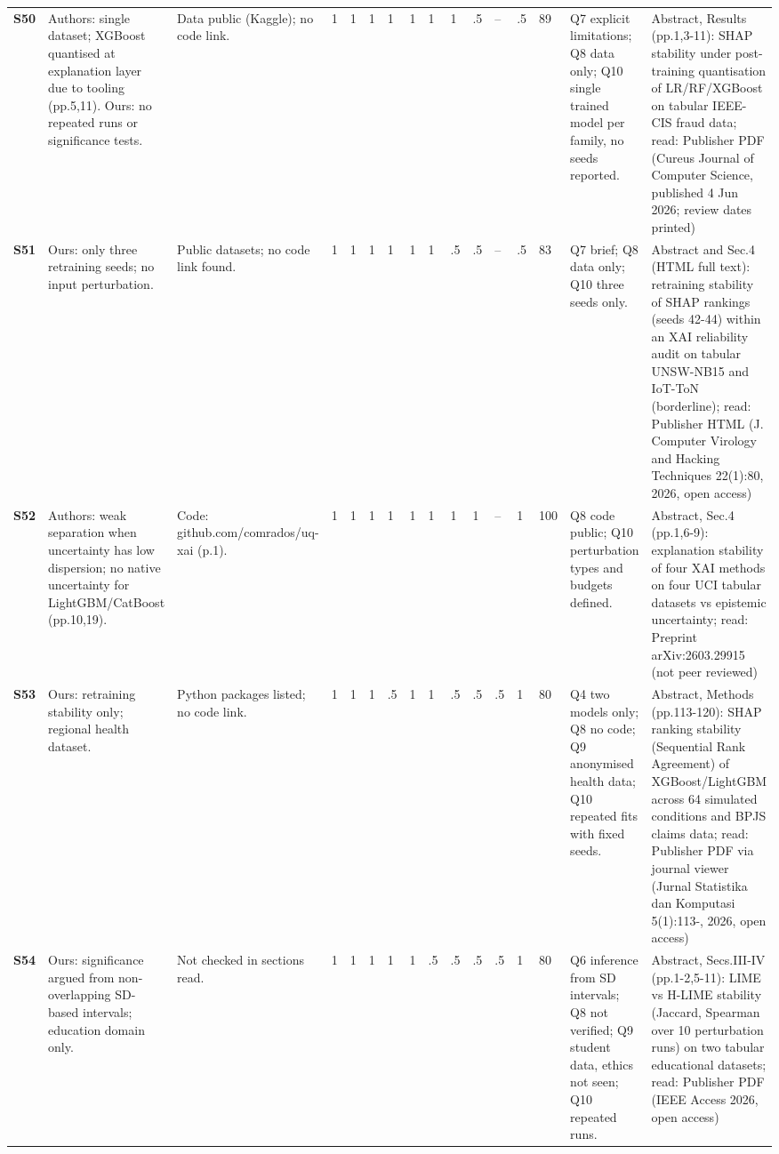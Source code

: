 \begin{longtable}{@{}P{1.0cm}P{4.6cm}P{3.6cm}P{0.3cm}P{0.3cm}P{0.3cm}P{0.3cm}P{0.3cm}P{0.3cm}P{0.3cm}P{0.3cm}P{0.3cm}P{0.36cm}P{0.75cm}P{3.0cm}P{3.9cm}@{}}
\textbf{S50} & Authors: single dataset; XGBoost quantised at explanation layer due to tooling (pp.5,11). Ours: no repeated runs or significance tests. & Data public (Kaggle); no code link. & 1 & 1 & 1 & 1 & 1 & 1 & 1 & .5 & -- & .5 & 89 & Q7 explicit limitations; Q8 data only; Q10 single trained model per family, no seeds reported. & Abstract, Results (pp.1,3-11): SHAP stability under post-training quantisation of LR/\allowbreak{}RF/\allowbreak{}XGBoost on tabular IEEE-CIS fraud data; read: Publisher PDF (Cureus Journal of Computer Science, published 4 Jun 2026; review dates printed) \\
\textbf{S51} & Ours: only three retraining seeds; no input perturbation. & Public datasets; no code link found. & 1 & 1 & 1 & 1 & 1 & 1 & .5 & .5 & -- & .5 & 83 & Q7 brief; Q8 data only; Q10 three seeds only. & Abstract and Sec.4 (HTML full text): retraining stability of SHAP rankings (seeds 42-44) within an XAI reliability audit on tabular UNSW-NB15 and IoT-ToN (borderline); read: Publisher HTML (J. Computer Virology and Hacking Techniques 22(1):80, 2026, open access) \\
\textbf{S52} & Authors: weak separation when uncertainty has low dispersion; no native uncertainty for LightGBM/\allowbreak{}CatBoost (pp.10,19). & Code: github.com/\allowbreak{}comrados/\allowbreak{}uq-xai (p.1). & 1 & 1 & 1 & 1 & 1 & 1 & 1 & 1 & -- & 1 & 100 & Q8 code public; Q10 perturbation types and budgets defined. & Abstract, Sec.4 (pp.1,6-9): explanation stability of four XAI methods on four UCI tabular datasets vs epistemic uncertainty; read: Preprint arXiv:2603.29915 (not peer reviewed) \\
\textbf{S53} & Ours: retraining stability only; regional health dataset. & Python packages listed; no code link. & 1 & 1 & 1 & .5 & 1 & 1 & .5 & .5 & .5 & 1 & 80 & Q4 two models only; Q8 no code; Q9 anonymised health data; Q10 repeated fits with fixed seeds. & Abstract, Methods (pp.113-120): SHAP ranking stability (Sequential Rank Agreement) of XGBoost/\allowbreak{}LightGBM across 64 simulated conditions and BPJS claims data; read: Publisher PDF via journal viewer (Jurnal Statistika dan Komputasi 5(1):113-, 2026, open access) \\
\textbf{S54} & Ours: significance argued from non-overlapping SD-based intervals; education domain only. & Not checked in sections read. & 1 & 1 & 1 & 1 & 1 & .5 & .5 & .5 & .5 & 1 & 80 & Q6 inference from SD intervals; Q8 not verified; Q9 student data, ethics not seen; Q10 repeated runs. & Abstract, Secs.III-IV (pp.1-2,5-11): LIME vs H-LIME stability (Jaccard, Spearman over 10 perturbation runs) on two tabular educational datasets; read: Publisher PDF (IEEE Access 2026, open access) \\

\end{longtable}
